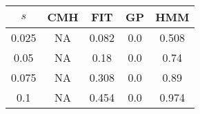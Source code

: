 \centering \begin{tabular}{c|c|c|c|c}
$s$	&CMH	&FIT	&GP	&HMM\\\hline
0.025	&NA	&0.082	&0.0	&0.508\\
0.05	&NA	&0.18	&0.0	&0.74\\
0.075	&NA	&0.308	&0.0	&0.89\\
0.1	&NA	&0.454	&0.0	&0.974\\
\end{tabular}
